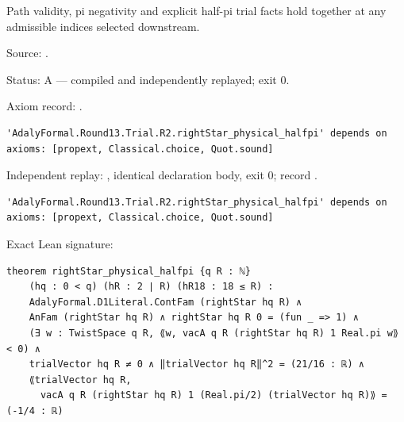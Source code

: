 \begin{theorem}[bp-436]
\label{bp-436}
\leanok
Path validity, pi negativity and explicit half-pi trial facts hold together at any admissible indices selected downstream.

\par Source: \texttt{}.
\par Status: A — compiled and independently replayed; exit 0.
\par Axiom record: \texttt{}.
\begin{verbatim}
'AdalyFormal.Round13.Trial.R2.rightStar_physical_halfpi' depends on axioms: [propext, Classical.choice, Quot.sound]
\end{verbatim}
\par Independent replay: \texttt{}, identical declaration body, exit 0; record \texttt{}.
\begin{verbatim}
'AdalyFormal.Round13.Trial.R2.rightStar_physical_halfpi' depends on axioms: [propext, Classical.choice, Quot.sound]
\end{verbatim}
\par Exact Lean signature:
\begin{verbatim}
theorem rightStar_physical_halfpi {q R : ℕ}
    (hq : 0 < q) (hR : 2 ∣ R) (hR18 : 18 ≤ R) :
    AdalyFormal.D1Literal.ContFam (rightStar hq R) ∧
    AnFam (rightStar hq R) ∧ rightStar hq R 0 = (fun _ => 1) ∧
    (∃ w : TwistSpace q R, ⟪w, vacA q R (rightStar hq R) 1 Real.pi w⟫ < 0) ∧
    trialVector hq R ≠ 0 ∧ ‖trialVector hq R‖^2 = (21/16 : ℝ) ∧
    ⟪trialVector hq R,
      vacA q R (rightStar hq R) 1 (Real.pi/2) (trialVector hq R)⟫ = (-1/4 : ℝ)
\end{verbatim}
\end{theorem}

